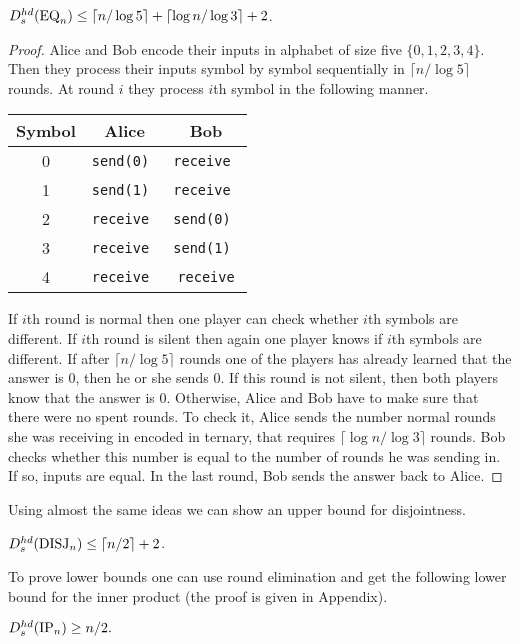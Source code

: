 \begin{theorem}
$D^{hd}_s(\mathrm{EQ}_n) \le \lceil n/\log 5\rceil + \lceil \log n / \log 3 \rceil + 2$.
\end{theorem}
\begin{proof}
Alice and Bob encode their inputs in alphabet of size five $\{0,1,2,3,4\}$. 
Then they process their inputs symbol by symbol sequentially in $\lceil n/\log 5\rceil$ rounds. 
At round $i$ they process $i$th symbol in the following manner.
\begin{center}
\begin{tabular}{c|c|c}
\bf Symbol & \bf Alice & \bf Bob \\\hline 
0 & \tt send(0)   & \tt receive  \\\hline
1 & \tt send(1)   & \tt receive  \\\hline
2 & \tt receive   & \tt send(0)  \\\hline
3 & \tt receive   & \tt send(1)  \\\hline
4 & \tt receive   & \tt receive
\end{tabular}
\end{center}
If $i$th round is normal then one player can check whether $i$th symbols are different.
If $i$th round is silent then again one player knows if $i$th symbols are different.
If after $\lceil n/\log 5\rceil$ rounds one of the players has already learned that the answer is $0$,
then he or she sends $0$. If this round is not silent, then both players know that the answer is $0$.
Otherwise, Alice and Bob have to make sure that there were no spent rounds.
To check it, Alice sends the number normal rounds 
she was receiving in encoded in ternary, that requires $\lceil \log n / \log 3 \rceil$ rounds.
Bob checks whether this number is equal to the number of rounds he was sending in. If so, inputs are equal.
In the last round, Bob sends the answer back to Alice.
\end{proof}
Using almost the same ideas we can show an upper bound for disjointness.
\begin{theorem}\label{thm:hds-disj}
$D^{hd}_s (\mathrm{DISJ}_n) \le \lceil n/2\rceil + 2$.
\end{theorem}

To prove lower bounds one can use round elimination and get the following lower bound for the inner product (the proof is given in Appendix).

\begin{theorem}\label{thm:hds-ip}
$D^{hd}_s(\mathrm{IP}_n)\ge n/2.$
\end{theorem}

